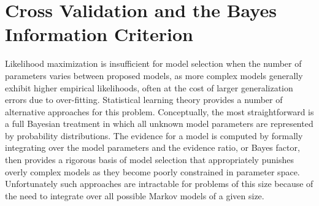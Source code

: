 \documentclass[journal=jpcbfk, layout=traditional, manuscript=article]{achemso}
\begin{document}

\section{Cross Validation and the Bayes Information Criterion}
Likelihood maximization is insufficient for model selection when the number of parameters varies between proposed models, as more complex models generally exhibit higher empirical likelihoods, often at the cost of larger generalization errors due to over-fitting\cite{Liddle2007Information, Hastie01Elements}. Statistical learning theory provides a number of alternative approaches for this problem. Conceptually, the most straightforward is a full Bayesian treatment in which all unknown model parameters are represented by probability distributions. The evidence for a model is computed by formally integrating over the model parameters and the evidence ratio, or Bayes factor\cite{Gelfand94Bayesian}, then provides a rigorous basis of model selection that appropriately punishes overly complex models as they become poorly constrained in parameter space. Unfortunately such approaches are intractable for problems of this size because of the need to integrate over all possible Markov models of a given size.
\end{document}
